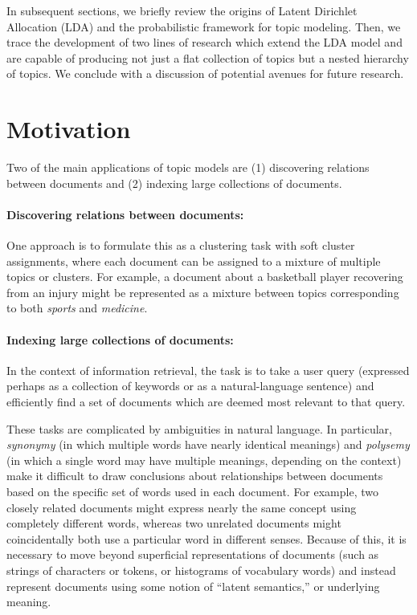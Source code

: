 \documentclass{article}
\begin{document}
In subsequent sections, we briefly review the origins of Latent Dirichlet Allocation (LDA) and the probabilistic framework for topic modeling.
Then, we trace the development of two lines of research which extend the LDA model and are capable of producing not just a flat collection of topics but a nested hierarchy of topics.
We conclude with a discussion of potential avenues for future research.

\section{Motivation}
Two of the main applications of topic models are (1) discovering relations between documents and (2) indexing large collections of documents.

\paragraph{Discovering relations between documents:}
One approach is to formulate this as a clustering task with soft cluster assignments, where each document can be assigned to a mixture of multiple topics or clusters.
For example, a document about a basketball player recovering from an injury might be represented as a mixture between topics corresponding to both \emph{sports} and \emph{medicine}.

\paragraph{Indexing large collections of documents:}
In the context of information retrieval, the task is to take a user query (expressed perhaps as a collection of keywords or as a natural-language sentence) and efficiently find a set of documents which are deemed most relevant to that query.

These tasks are complicated by ambiguities in natural language.
In particular, \emph{synonymy} (in which multiple words have nearly identical meanings) and \emph{polysemy} (in which a single word may have multiple meanings, depending on the context) make it difficult to draw conclusions about relationships between documents based on the specific set of words used in each document.
For example, two closely related documents might express nearly the same concept using completely different words, whereas two unrelated documents might coincidentally both use a particular word in different senses.
Because of this, it is necessary to move beyond superficial representations of documents (such as strings of characters or tokens, or histograms of vocabulary words) and instead represent documents using some notion of ``latent semantics,'' or underlying meaning.
\end{document}
